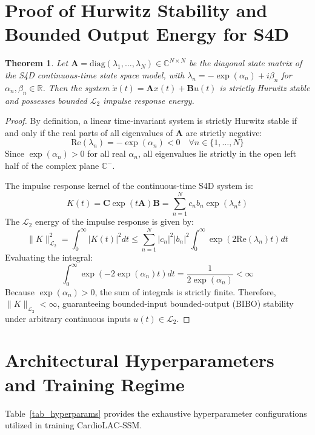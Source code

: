 \documentclass[journal,11pt,draftclsnofoot,onecolumn]{IEEEtran}
\newtheorem{theorem}{Theorem}
\begin{document}
\section{Proof of Hurwitz Stability and Bounded Output Energy for S4D}
\label{app_stability}
\begin{theorem}
Let $\mathbf{A} = \text{diag}(\lambda_1, \dots, \lambda_N) \in \mathbb{C}^{N \times N}$ be the diagonal state matrix of the S4D continuous-time state space model, with $\lambda_n = -\exp(\alpha_n) + i\beta_n$ for $\alpha_n, \beta_n \in \mathbb{R}$. Then the system $\dot{x}(t) = \mathbf{A}x(t) + \mathbf{B}u(t)$ is strictly Hurwitz stable and possesses bounded $\mathcal{L}_2$ impulse response energy.
\end{theorem}
\begin{proof}
By definition, a linear time-invariant system is strictly Hurwitz stable if and only if the real parts of all eigenvalues of $\mathbf{A}$ are strictly negative:
\begin{equation}
    \text{Re}(\lambda_n) = -\exp(\alpha_n) < 0 \quad \forall n \in \{1, \dots, N\}
\end{equation}
Since $\exp(\alpha_n) > 0$ for all real $\alpha_n$, all eigenvalues lie strictly in the open left half of the complex plane $\mathbb{C}^-$.

The impulse response kernel of the continuous-time S4D system is:
\begin{equation}
    K(t) = \mathbf{C} \exp(t \mathbf{A}) \mathbf{B} = \sum_{n=1}^N c_n b_n \exp(\lambda_n t)
\end{equation}
The $\mathcal{L}_2$ energy of the impulse response is given by:
\begin{equation}
    \|K\|_{\mathcal{L}_2}^2 = \int_0^\infty |K(t)|^2 dt \le \sum_{n=1}^N |c_n|^2 |b_n|^2 \int_0^\infty \exp(2 \text{Re}(\lambda_n) t) dt
\end{equation}
Evaluating the integral:
\begin{equation}
    \int_0^\infty \exp(-2\exp(\alpha_n) t) dt = \frac{1}{2\exp(\alpha_n)} < \infty
\end{equation}
Because $\exp(\alpha_n) > 0$, the sum of integrals is strictly finite. Therefore, $\|K\|_{\mathcal{L}_2} < \infty$, guaranteeing bounded-input bounded-output (BIBO) stability under arbitrary continuous inputs $u(t) \in \mathcal{L}_2$.
\end{proof}

\section{Architectural Hyperparameters and Training Regime}
Table~\ref{tab_hyperparams} provides the exhaustive hyperparameter configurations utilized in training CardioLAC-SSM.
\end{document}
